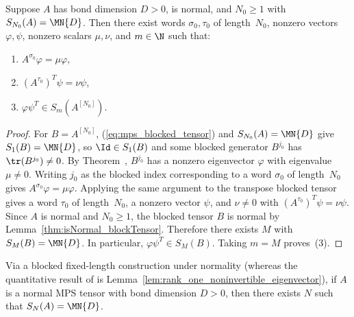 \begin{lemma}%
    \label{thm:rankone_extraction_blockTensor}
    \leanok
    Suppose $A$ has bond dimension $D>0$, is normal, and $N_0\ge1$ with
    $S_{N_0}(A)=\MN{D}$.
    Then there exist words $\sigma_0,\tau_0$ of length~$N_0$,
    nonzero vectors $\varphi,\psi$, nonzero scalars $\mu,\nu$,
    and $m\in\N$ such that:
    \begin{enumerate}
        \item $A^{\sigma_0}\varphi=\mu\varphi$,
        \item $(A^{\tau_0})^T\psi=\nu\psi$,
        \item $\varphi\psi^T\in S_m(A^{[N_0]})$.
    \end{enumerate}
\end{lemma}

\begin{proof}
    \leanok
    For $B=A^{[N_0]}$, (\ref{eq:mps_blocked_tensor}) and
    $S_{N_0}(A)=\MN{D}$ give $S_1(B)=\MN{D}$, so $\Id\in S_1(B)$ and some
    blocked generator $B^{j_0}$ has $\tr(B^{j_0})\neq0$.
    By Theorem~\cite[``Nonzero trace implies eigenvector'']{QICLean2026Blueprint},
    $B^{j_0}$ has a nonzero eigenvector $\varphi$
    with eigenvalue $\mu\neq0$.
    Writing $j_0$ as the blocked index corresponding to a word
    $\sigma_0$ of length~$N_0$ gives
    $A^{\sigma_0}\varphi=\mu\varphi$.
    Applying the same argument to the transpose blocked tensor gives
    a word $\tau_0$ of length~$N_0$, a nonzero vector $\psi$,
    and $\nu\neq0$ with $(A^{\tau_0})^T\psi=\nu\psi$.
    Since $A$ is normal and $N_0\ge1$,
    the blocked tensor $B$ is normal by
    Lemma~\ref{thm:isNormal_blockTensor}.
    Therefore there exists $M$ with $S_M(B)=\MN{D}$.
    In particular, $\varphi\psi^T\in S_M(B)$.
    Taking $m=M$ proves~(3).
\end{proof}

\begin{lemma}\label{thm:wielandt_lemma2b}
    \leanok
    Via a blocked fixed-length construction under normality (whereas the
    quantitative result of \cite[Lemma~2(b)]{Sanz2010Quantum} is
    Lemma~\ref{lem:rank_one_noninvertible_eigenvector}), if $A$ is
    a normal MPS tensor with bond dimension $D>0$, then there exists $N$ such
    that $S_N(A)=\MN{D}$.
\end{lemma}

